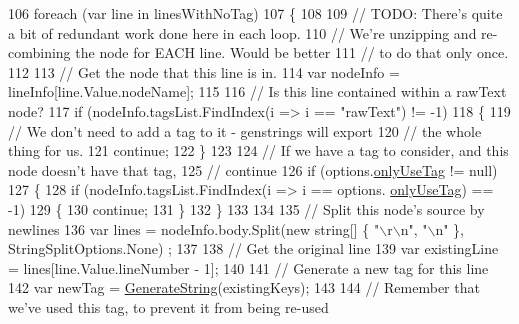 \begin{DoxyCode}
106                 \textcolor{keywordflow}{foreach} (var line \textcolor{keywordflow}{in} linesWithNoTag)
107                 \{
108 
109                     \textcolor{comment}{// TODO: There's quite a bit of redundant work done here in each loop.}
110                     \textcolor{comment}{// We're unzipping and re-combining the node for EACH line. Would be better}
111                     \textcolor{comment}{// to do that only once.}
112 
113                     \textcolor{comment}{// Get the node that this line is in.}
114                     var nodeInfo = lineInfo[line.Value.nodeName];
115 
116                     \textcolor{comment}{// Is this line contained within a rawText node?}
117                     \textcolor{keywordflow}{if} (nodeInfo.tagsList.FindIndex(i => i == \textcolor{stringliteral}{"rawText"}) != -1)
118                     \{
119                         \textcolor{comment}{// We don't need to add a tag to it - genstrings will export}
120                         \textcolor{comment}{// the whole thing for us.}
121                         \textcolor{keywordflow}{continue};
122                     \}
123 
124                     \textcolor{comment}{// If we have a tag to consider, and this node doesn't have that tag,}
125                     \textcolor{comment}{// continue}
126                     \textcolor{keywordflow}{if} (options.\hyperlink{a00039_ab6162338f9606a836f3101fe0e228249}{onlyUseTag} != null)
127                     \{
128                         \textcolor{keywordflow}{if} (nodeInfo.tagsList.FindIndex(i => i == options.
      \hyperlink{a00039_ab6162338f9606a836f3101fe0e228249}{onlyUseTag}) == -1)
129                         \{
130                             \textcolor{keywordflow}{continue};
131                         \}
132                     \}
133 
134 
135                     \textcolor{comment}{// Split this node's source by newlines}
136                     var lines = nodeInfo.body.Split(\textcolor{keyword}{new} \textcolor{keywordtype}{string}[] \{ \textcolor{stringliteral}{"\(\backslash\)r\(\backslash\)n"}, \textcolor{stringliteral}{"\(\backslash\)n"} \}, StringSplitOptions.None)
      ;
137 
138                     \textcolor{comment}{// Get the original line}
139                     var existingLine = lines[line.Value.lineNumber - 1];
140 
141                     \textcolor{comment}{// Generate a new tag for this line}
142                     var newTag = \hyperlink{a00132_a91ad68b679bd3b0bd89fe92ea5068688}{GenerateString}(existingKeys);
143 
144                     \textcolor{comment}{// Remember that we've used this tag, to prevent it from being re-used}

\end{DoxyCode}
